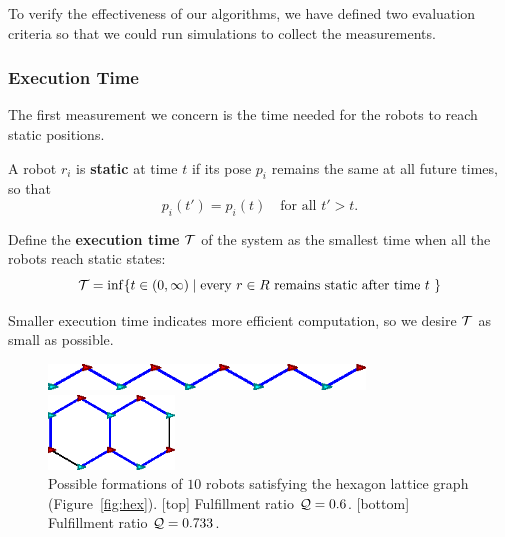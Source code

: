 To verify the effectiveness of our algorithms, we have defined two evaluation criteria so that we could run simulations to collect the measurements.

\subsubsection{Execution Time}
The first measurement we concern is the time needed for the robots to reach static positions.

\begin{defn}
A robot $r_i$ is \textbf{static} at time $t$ if its pose $p_i$
remains the same at all future times, so that 
  \begin{equation}
    p_i(t') = p_i(t) \quad \mbox {for all } t' > t.
  \end{equation}
\end{defn}

Define the \textbf{execution time} $\mathcal{T}$ of the system as the smallest time when all the robots reach static states:
\begin{equation}
  \mathcal{T} = \inf \{t \in (0, \infty) \mid \mbox{every $r \in R$ remains static
    after time $t$ } \}
\end{equation}

Smaller execution time indicates more efficient computation, so we desire $\mathcal{T}$ as small as possible.

\begin{figure}  
    \centering
    \begin{minipage}[b]{0.95\linewidth}
        \centering
        \includegraphics[width=0.75\textwidth]{figs/bad-hexagon}
    \end{minipage}
    \begin{minipage}[b]{0.95\linewidth}
        \centering
        \includegraphics[width=0.3\textwidth]{figs/good-hexagon}
    \end{minipage}
    \caption{Possible formations of $10$ robots satisfying the hexagon lattice graph (Figure~\ref{fig:hex}). 
    [top] Fulfillment ratio $\mathcal{Q}=0.6$. 
    [bottom] Fulfillment ratio $\mathcal{Q} = 0.733$.}
    \label{fig:hex-qual}
\end{figure}

